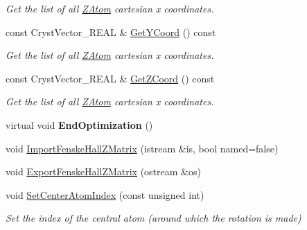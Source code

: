 \begin{DoxyCompactItemize}
\begin{DoxyCompactList}\small\item\em Get the list of all \mbox{\hyperlink{class_obj_cryst_1_1_z_atom}{Z\+Atom}} cartesian x coordinates. \end{DoxyCompactList}\item 
\mbox{\label{class_obj_cryst_1_1_z_scatterer_ab73089c2ffb605b3afcf01b0badd9d2a}} 
const Cryst\+Vector\+\_\+\+R\+E\+AL \& \mbox{\hyperlink{class_obj_cryst_1_1_z_scatterer_ab73089c2ffb605b3afcf01b0badd9d2a}{Get\+Y\+Coord}} () const
\begin{DoxyCompactList}\small\item\em Get the list of all \mbox{\hyperlink{class_obj_cryst_1_1_z_atom}{Z\+Atom}} cartesian x coordinates. \end{DoxyCompactList}\item 
\mbox{\label{class_obj_cryst_1_1_z_scatterer_a9daf54a58413751c7d749edfb1a1dd38}} 
const Cryst\+Vector\+\_\+\+R\+E\+AL \& \mbox{\hyperlink{class_obj_cryst_1_1_z_scatterer_a9daf54a58413751c7d749edfb1a1dd38}{Get\+Z\+Coord}} () const
\begin{DoxyCompactList}\small\item\em Get the list of all \mbox{\hyperlink{class_obj_cryst_1_1_z_atom}{Z\+Atom}} cartesian x coordinates. \end{DoxyCompactList}\item 
\mbox{\label{class_obj_cryst_1_1_z_scatterer_a81071adf5b27040ea701c1fab7265639}} 
virtual void {\bfseries End\+Optimization} ()
\item 
void \mbox{\hyperlink{class_obj_cryst_1_1_z_scatterer_a097d27206e6e54259bb987a06d65f71c}{Import\+Fenske\+Hall\+Z\+Matrix}} (istream \&is, bool named=false)
\item 
void \mbox{\hyperlink{class_obj_cryst_1_1_z_scatterer_a551fabc1d57cab02e957946dcfa1aae7}{Export\+Fenske\+Hall\+Z\+Matrix}} (ostream \&os)
\item 
\mbox{\label{class_obj_cryst_1_1_z_scatterer_a225e9fe8e640555f24bfbb5f6ec2fe25}} 
void \mbox{\hyperlink{class_obj_cryst_1_1_z_scatterer_a225e9fe8e640555f24bfbb5f6ec2fe25}{Set\+Center\+Atom\+Index}} (const unsigned int)
\begin{DoxyCompactList}\small\item\em Set the index of the central atom (around which the rotation is made) \end{DoxyCompactList}\item 

\end{DoxyCompactItemize}
